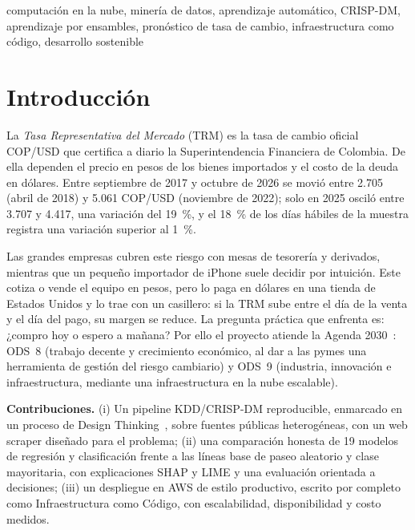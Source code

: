 \documentclass[conference]{IEEEtran}
\begin{document}
\begin{abstract}
\end{abstract}

\begin{IEEEkeywords}
computación en la nube, minería de datos, aprendizaje automático, CRISP-DM, aprendizaje por ensambles, pronóstico de tasa de cambio, infraestructura como código, desarrollo sostenible
\end{IEEEkeywords}

\section{Introducción}
La \emph{Tasa Representativa del Mercado} (TRM) es la tasa de cambio oficial COP/USD que certifica a diario la Superintendencia Financiera de Colombia. De ella dependen el precio en pesos de los bienes importados y el costo de la deuda en dólares. Entre septiembre de 2017 y octubre de 2026 se movió entre 2.705 (abril de 2018) y 5.061 COP/USD (noviembre de 2022); solo en 2025 osciló entre 3.707 y 4.417, una variación del 19~\%, y el 18~\% de los días hábiles de la muestra registra una variación superior al 1~\%.

Las grandes empresas cubren este riesgo con mesas de tesorería y derivados, mientras que un pequeño importador de iPhone suele decidir por intuición. Este cotiza o vende el equipo en pesos, pero lo paga en dólares en una tienda de Estados Unidos y lo trae con un casillero: si la TRM sube entre el día de la venta y el día del pago, su margen se reduce. La pregunta práctica que enfrenta es: ¿compro hoy o espero a mañana? Por ello el proyecto atiende la Agenda 2030~\cite{un2015}: ODS~8 (trabajo decente y crecimiento económico, al dar a las pymes una herramienta de gestión del riesgo cambiario) y ODS~9 (industria, innovación e infraestructura, mediante una infraestructura en la nube escalable).

\textbf{Contribuciones.} (i) Un pipeline KDD/CRISP-DM reproducible, enmarcado en un proceso de Design Thinking~\cite{brown2008}, sobre fuentes públicas heterogéneas, con un web scraper diseñado para el problema; (ii) una comparación honesta de 19 modelos de regresión y clasificación frente a las líneas base de paseo aleatorio y clase mayoritaria, con explicaciones SHAP y LIME y una evaluación orientada a decisiones; (iii) un despliegue en AWS de estilo productivo, escrito por completo como Infraestructura como Código, con escalabilidad, disponibilidad y costo medidos.
\end{document}
